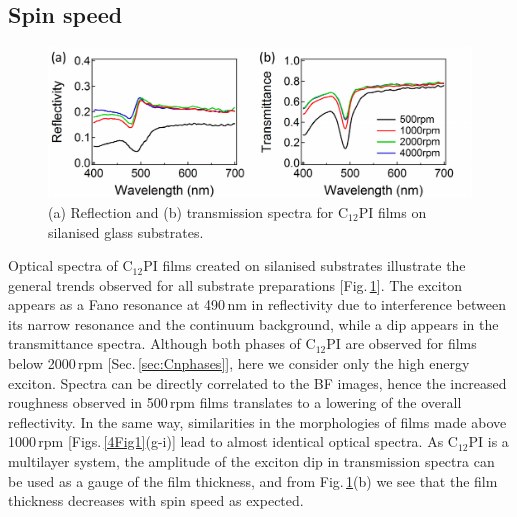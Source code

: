 \subsection{Spin speed}
\begin{figure}[h!]
\centering
\includegraphics[width=\textwidth]{Fig2}
\caption{(a) Reflection and (b) transmission spectra for C$_{12}$PI films on silanised glass substrates.}
\label{4Fig2}
\end{figure}
Optical spectra of C$_{12}$PI films created on silanised substrates illustrate the general trends observed for all substrate preparations [Fig.\,\ref{4Fig2}]. The exciton appears as a Fano resonance at 490\,nm in reflectivity due to interference between its narrow resonance and the continuum background, while a dip appears in the transmittance spectra. Although both phases of C$_{12}$PI are observed for films below 2000\,rpm [Sec.\,\ref{sec:Cnphases}], here we consider only the high energy exciton. Spectra can be directly correlated to the BF images, hence the increased roughness observed in 500\,rpm films translates to a lowering of the overall reflectivity. In the same way, similarities in the morphologies of films made above 1000\,rpm [Figs.\,\ref{4Fig1}(g-i)] lead to almost identical optical spectra. As C$_{12}$PI is a multilayer system, the amplitude of the exciton dip in transmission spectra can be used as a gauge of the film thickness, and from Fig.\,\ref{4Fig2}(b) we see that the film thickness decreases with spin speed as expected.

